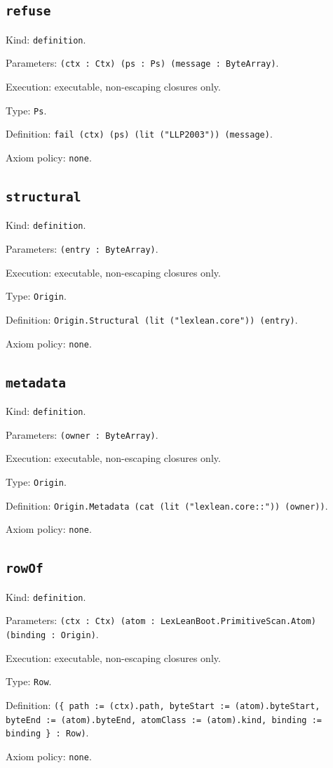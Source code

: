 \documentclass[11pt]{article}
\begin{document}
\subsection*{\texttt{refuse}}
\noindent Kind: \texttt{definition}.\par
\noindent Parameters: \texttt{(ctx : Ctx) (ps : Ps) (message : ByteArray)}.\par
\noindent Execution: executable, non-escaping closures only.\par
\noindent Type: \texttt{Ps}.\par
\noindent Definition: \texttt{fail (ctx) (ps) (lit ("LLP2003")) (message)}.\par
\noindent Axiom policy: \texttt{none}.\par
\subsection*{\texttt{structural}}
\noindent Kind: \texttt{definition}.\par
\noindent Parameters: \texttt{(entry : ByteArray)}.\par
\noindent Execution: executable, non-escaping closures only.\par
\noindent Type: \texttt{Origin}.\par
\noindent Definition: \texttt{Origin.Structural (lit ("lexlean.core")) (entry)}.\par
\noindent Axiom policy: \texttt{none}.\par
\subsection*{\texttt{metadata}}
\noindent Kind: \texttt{definition}.\par
\noindent Parameters: \texttt{(owner : ByteArray)}.\par
\noindent Execution: executable, non-escaping closures only.\par
\noindent Type: \texttt{Origin}.\par
\noindent Definition: \texttt{Origin.Metadata (cat (lit ("lexlean.core::")) (owner))}.\par
\noindent Axiom policy: \texttt{none}.\par
\subsection*{\texttt{rowOf}}
\noindent Kind: \texttt{definition}.\par
\noindent Parameters: \texttt{(ctx : Ctx) (atom : LexLeanBoot.PrimitiveScan.Atom) (binding : Origin)}.\par
\noindent Execution: executable, non-escaping closures only.\par
\noindent Type: \texttt{Row}.\par
\noindent Definition: \texttt{(\{ path := (ctx).path, byteStart := (atom).byteStart, byteEnd := (atom).byteEnd, atomClass := (atom).kind, binding := binding \} : Row)}.\par
\noindent Axiom policy: \texttt{none}.\par
\end{document}
